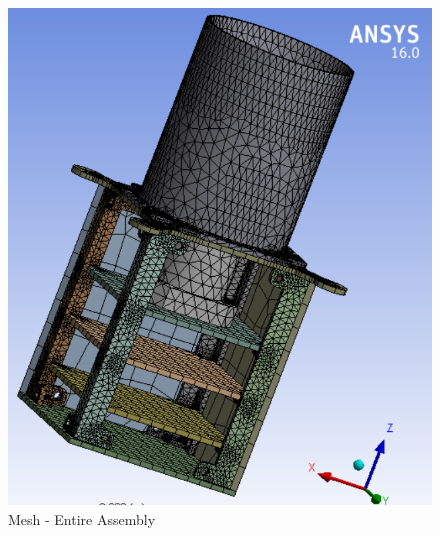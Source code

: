 \documentclass[../../main.tex]{subfiles}
\begin{document}
\begin{enumerate}
\begin{enumerate}
\begin{enumerate}
\begin{figure}[H]
                    \includegraphics[scale=0.6]{Figures/Mechanical/Entire_STADS_Mesh.PNG}
                    \caption{Mesh - Entire Assembly}
                    \label{fig:sys_CAD}
                \end{figure}
                

\end{enumerate}
\end{enumerate}
\end{enumerate}
\end{document}
